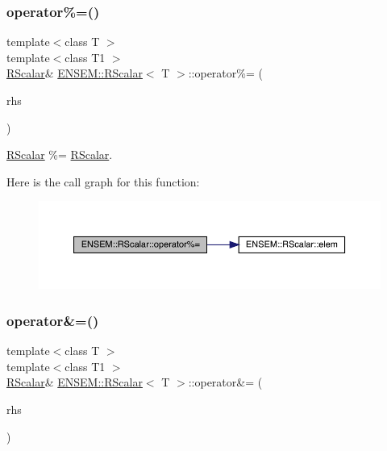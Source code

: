 \subsubsection{\texorpdfstring{operator\%=()}{operator\%=()}\hspace{0.1cm}{\footnotesize\ttfamily [2/2]}}
{\footnotesize\ttfamily template$<$class T $>$ \\
template$<$class T1 $>$ \\
\mbox{\hyperlink{classENSEM_1_1RScalar}{R\+Scalar}}\& \mbox{\hyperlink{classENSEM_1_1RScalar}{E\+N\+S\+E\+M\+::\+R\+Scalar}}$<$ T $>$\+::operator\%= (\begin{DoxyParamCaption}\item[{const \mbox{\hyperlink{classENSEM_1_1RScalar}{R\+Scalar}}$<$ T1 $>$ \&}]{rhs }\end{DoxyParamCaption})\hspace{0.3cm}{\ttfamily [inline]}}



\mbox{\hyperlink{classENSEM_1_1RScalar}{R\+Scalar}} \%= \mbox{\hyperlink{classENSEM_1_1RScalar}{R\+Scalar}}. 

Here is the call graph for this function\+:
\nopagebreak
\begin{figure}[H]
\begin{center}
\leavevmode
\includegraphics[width=350pt]{d0/d8c/classENSEM_1_1RScalar_ac5ab25042d679a621ccb42d13fb3b441_cgraph}
\end{center}
\end{figure}
\mbox{\label{classENSEM_1_1RScalar_aa091ededdea0fc13deb359321f213780}} 
\subsubsection{\texorpdfstring{operator\&=()}{operator\&=()}\hspace{0.1cm}{\footnotesize\ttfamily [1/2]}}
{\footnotesize\ttfamily template$<$class T $>$ \\
template$<$class T1 $>$ \\
\mbox{\hyperlink{classENSEM_1_1RScalar}{R\+Scalar}}\& \mbox{\hyperlink{classENSEM_1_1RScalar}{E\+N\+S\+E\+M\+::\+R\+Scalar}}$<$ T $>$\+::operator\&= (\begin{DoxyParamCaption}\item[{const \mbox{\hyperlink{classENSEM_1_1RScalar}{R\+Scalar}}$<$ T1 $>$ \&}]{rhs }\end{DoxyParamCaption})\hspace{0.3cm}{\ttfamily [inline]}}



